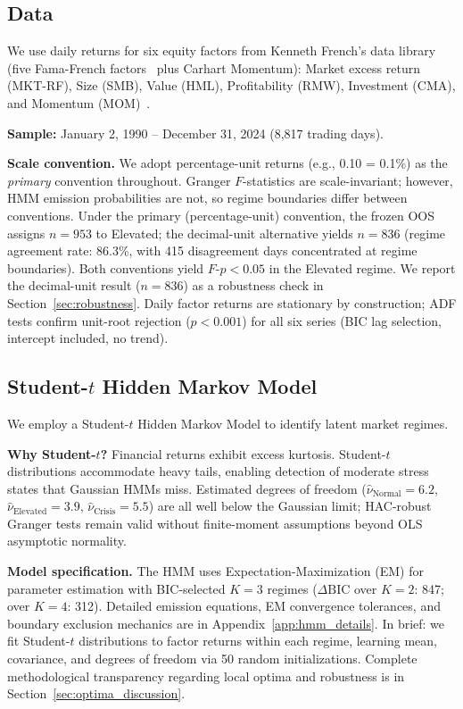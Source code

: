 \documentclass[sigconf,anonymous]{acmart}
\begin{document}
\subsection{Data}

We use daily returns for six equity factors from Kenneth French's data library~\cite{french2024data} (five Fama-French factors~\cite{fama2015five} plus Carhart Momentum):
Market excess return (MKT-RF), Size (SMB), Value (HML), Profitability (RMW),
Investment (CMA), and Momentum (MOM)~\cite{jegadeesh1993returns,carhart1997persistence}.

\textbf{Sample:} January 2, 1990 -- December 31, 2024 (8,817 trading days).

\textbf{Scale convention.} We adopt percentage-unit returns (e.g., 0.10 = 0.1\%) as the \emph{primary} convention throughout.
Granger $F$-statistics are scale-invariant; however, HMM emission probabilities are not,
so regime boundaries differ between conventions. Under the primary (percentage-unit) convention,
the frozen OOS assigns $n = 953$ to Elevated; the decimal-unit alternative yields $n = 836$
(regime agreement rate: 86.3\%, with 415 disagreement days concentrated at regime boundaries).
Both conventions yield $F$-$p < 0.05$ in the Elevated regime.
We report the decimal-unit result ($n = 836$) as a robustness check in Section~\ref{sec:robustness}.
Daily factor returns are stationary by construction; ADF tests confirm unit-root
rejection ($p < 0.001$) for all six series (BIC lag selection, intercept included,
no trend).

\subsection{Student-\texorpdfstring{$t$}{t} Hidden Markov Model}
\label{sec:hmm}

We employ a Student-$t$ Hidden Markov Model to identify latent market regimes.

\textbf{Why Student-$t$?} Financial returns exhibit excess kurtosis.
Student-$t$ distributions accommodate heavy tails, enabling detection of
moderate stress states that Gaussian HMMs miss.
Estimated degrees of freedom ($\hat{\nu}_{\text{Normal}} = 6.2$,
$\hat{\nu}_{\text{Elevated}} = 3.9$, $\hat{\nu}_{\text{Crisis}} = 5.5$)
are all well below the Gaussian limit; HAC-robust Granger tests remain
valid without finite-moment assumptions beyond OLS asymptotic normality.

\textbf{Model specification.} The HMM uses Expectation-Maximization (EM) for parameter estimation with
BIC-selected $K=3$ regimes ($\Delta\text{BIC}$ over $K{=}2$: 847; over $K{=}4$: 312).
Detailed emission equations, EM convergence tolerances, and boundary exclusion mechanics are
in Appendix~\ref{app:hmm_details}. In brief: we fit Student-$t$ distributions to factor
returns within each regime, learning mean, covariance, and degrees of freedom via 50 random
initializations. Complete methodological transparency regarding local optima and robustness
is in Section~\ref{sec:optima_discussion}.
\end{document}
